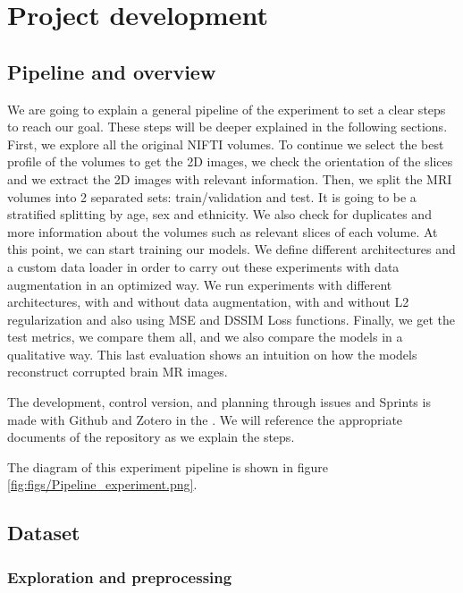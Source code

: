 \chapter{Project development}
\label{chapter:development}

\section{Pipeline and overview}

We are going to explain a general pipeline of the experiment to set a clear steps to reach our goal. These steps will be deeper explained in the following sections. First, we explore all the original NIFTI volumes. To continue we select the best profile of the volumes to get the 2D images, we check the orientation of the slices and we extract the 2D images with relevant information. Then, we split the MRI volumes into 2 separated sets: train/validation and test. It is going to be a stratified splitting by age, sex and ethnicity. We also check for duplicates and more information about the volumes such as relevant slices of each volume. At this point, we can start training our models. We define different architectures and a custom data loader in order to carry out these experiments with data augmentation in an optimized way. We run experiments with different architectures, with and without data augmentation, with and without L2 regularization and also using MSE and DSSIM Loss functions. Finally, we get the test metrics, we compare them all, and we also compare the models in a qualitative way. This last evaluation shows an intuition on how the models reconstruct corrupted brain MR images. 

The development, control version, and planning through issues and Sprints is made with Github and Zotero in the . We will reference the appropriate documents of the repository as we explain the steps.

The diagram of this experiment pipeline is shown in figure \ref{fig:figs/Pipeline_experiment.png}.

\FloatBarrier

\section{Dataset}

\subsection{Exploration and preprocessing}

